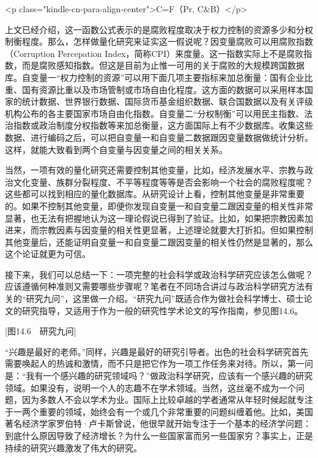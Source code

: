 <p class="kindle-cn-para-align-center">C=F（Pr, C\&B）</p>

上文已经介绍，这一函数公式表示的是腐败程度取决于权力控制的资源多少和分权制衡程度。那么，怎样做量化研究来证实这一假说呢？因变量腐败可以用腐败指数（Corruption Percepation Index，简称CPI）来度量。这一指数实际上不是腐败指数，而是腐败感知指数。但这是目前为止惟一可用的关于腐败的大规模跨国数据库。自变量一“权力控制的资源”可以用下面几项主要指标来加总衡量：国有企业比重、国有资源比重以及市场管制或市场自由化程度。这方面的数据可以采用样本国家的统计数据、世界银行数据、国际货币基金组织数据、联合国数据以及有关评级机构公布的各主要国家市场自由化指数。自变量二“分权制衡”可以用民主指数、法治指数或政治制度分权指数等来加总衡量，这方面国际上有不少数据库。收集这些数据、进行编码之后，可以把自变量一和自变量二数据跟因变量数据做统计分析。这样，就能大致看到两个自变量与因变量之间的相关关系。

当然，一项有效的量化研究还需要控制其他变量，比如，经济发展水平、宗教与政治文化变量、族群分裂程度、不平等程度等等是否会影响一个社会的腐败程度呢？这些都可以找到相应的量化数据库。从研究设计上看，控制其他变量是非常重要的。如果不控制其他变量，即便你发现自变量一和自变量二跟因变量的相关性非常显著，也无法有把握地认为这一理论假说已得到了验证。比如，如果把宗教因素加进来，而宗教因素与因变量的相关性更显著，上述理论就要大打折扣。但如果控制其他变量后，还能证明自变量一和自变量二跟因变量的相关性仍然是显著的，那么这个论证就更为可信。


接下来，我们可以总结一下：一项完整的社会科学或政治科学研究应该怎么做呢？应该遵循何种准则又需要哪些步骤呢？笔者在不同场合讲过与政治科学研究方法有关的“研究九问”，这里做一介绍。“研究九问”既适合作为做社会科学博士、硕士论文的研究指导，又适用于作为一般的研究性学术论文的写作指南，参见图14.6。

[图14.6　研究九问]

“兴趣是最好的老师。”同样，兴趣是最好的研究引导者。出色的社会科学研究首先需要唤起人的热诚和激情，而不只是把它作为一项工作任务来对待。所以，第一问是：“我有一个感兴趣的研究领域吗？”做政治科学研究，应该有一个感兴趣的研究领域。如果没有，说明一个人的志趣不在学术领域。当然，这丝毫不成为一个问题，因为多数人不会以学术为业。国际上比较卓越的学者通常从年轻时候起就专注于一两个重要的领域，始终会有一个或几个非常重要的问题纠缠着他。比如，美国著名经济学家罗伯特·卢卡斯曾说，他很早就开始专注于一个基本的经济学问题：到底什么原因导致了经济增长？为什么一些国家富而另一些国家穷？事实上，正是持续的研究兴趣激发了伟大的研究。

